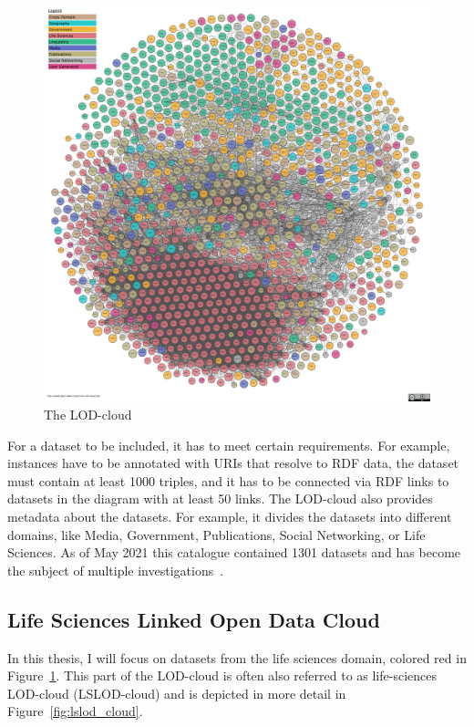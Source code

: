 \documentclass[runningheads]{llncs}
\begin{document}
    \begin{figure}[ht]
        \centering
        \includegraphics[width=\textwidth]{figures/lod-cloud-sm}
        \caption{The LOD-cloud\protect\footnotemark[\value{footnote}]}
        \label{fig:lod_cloud}
    \end{figure}

    For a dataset to be included, it has to meet certain requirements.
    For example, instances have to be annotated with URIs that resolve to RDF data, the dataset must contain at least 1000 triples, and it has to be connected via RDF links to datasets in the diagram with at least 50 links.
    The LOD-cloud also provides metadata about the datasets.
    For example, it divides the datasets into different domains, like Media, Government, Publications, Social Networking, or Life Sciences.
    As of May 2021 this catalogue contained 1301 datasets and has become the subject of multiple investigations~\citep{debattista2019lod, kamdar2019enabling, schmachtenberg2014adoption}.

    \subsection{Life Sciences Linked Open Data Cloud}
    In this thesis, I will focus on datasets from the life sciences domain, colored red in Figure~\ref{fig:lod_cloud}.
    This part of the LOD-cloud is often also referred to as life-sciences LOD-cloud (LSLOD-cloud) and is depicted in more detail in Figure~\ref{fig:lslod_cloud}.
\end{document}

